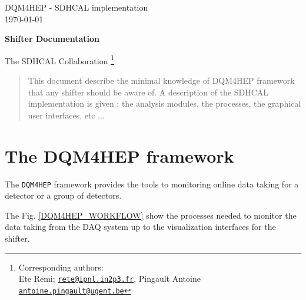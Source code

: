 \documentclass[12pt]{article}
\begin{document}


\begin{titlepage}
  
  \begin{flushright}
    DQM4HEP - SDHCAL implementation\\
              \today\\
  \end{flushright}
  \bigskip\bigskip\bigskip\bigskip\bigskip
  \begin{center}
  \huge \bf 
  Shifter Documentation
  \end{center}\bigskip\bigskip 
  \begin{center}{
  {\LARGE The SDHCAL Collaboration}
  \footnote{Corresponding authors: \\
  Ete Remi; \href{rete@ipnl.in2p3.fr}{\tt rete@ipnl.in2p3.fr}, Pingault Antoine \href{antoine.pingault@ugent.be}{\tt antoine.pingault@ugent.be} }}
  \end{center}\bigskip\bigskip
  \bigskip

  \begin{abstract}
    This document describe the minimal knowledge of DQM4HEP framework that any shifter should be aware of. A description of the SDHCAL implementation is given : the analysis modules, the processes, the graphical user interfaces, etc ...
  \end{abstract}
  
\end{titlepage}

\tableofcontents

\section{The DQM4HEP framework}


The \verb?DQM4HEP? framework provides the tools to monitoring online data taking for a detector or a group of detectors. 

The Fig. \ref{DQM4HEP_WORKFLOW} show the processes needed to monitor the data taking from the DAQ system up to the visualization interfaces for the shifter.
\end{document}
